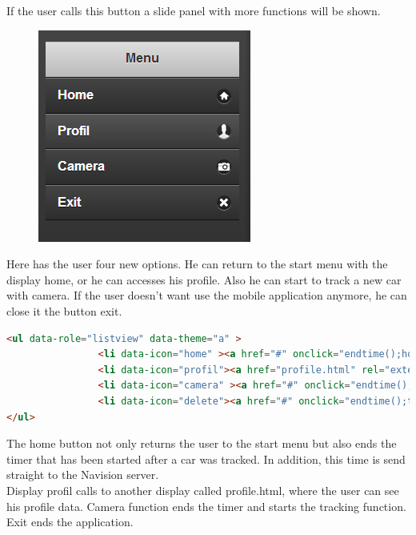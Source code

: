 If the user calls this button a slide panel with more functions will be shown.
\\
\begin{figure}[H]
\centering
\includegraphics[width=0.4\linewidth]{graphics/chapter4/14}
\caption{}
\label{fig:15}
\end{figure}
\newpage
Here has the user four new options. He can return to the start menu with the display home, or he can accesses his profile. Also he can start to track a new car with camera. If the user doesn't want use the mobile application anymore, he can close it the button exit. 
\\
\begin{lstlisting}[language=html, caption= 
start timer function,captionpos=b]
<ul data-role="listview" data-theme="a" >
                <li data-icon="home" ><a href="#" onclick="endtime();home();">Home</a></li>
                <li data-icon="profil"><a href="profile.html" rel="external" >Profil</a></li>
                <li data-icon="camera" ><a href="#" onclick="endtime();trackClick();">Camera</a></li>
                <li data-icon="delete"><a href="#" onclick="endtime();turnOff();">Exit</a></li>
</ul>
\end{lstlisting}

The home button not only returns the user to the start menu but also ends the timer that has been started after a car was tracked. In addition, this time is send straight to the Navision server.  
\\

Display profil calls to another display called profile.html, where the user can see his profile data. 
Camera function ends the timer and starts the tracking function. Exit ends the application.



